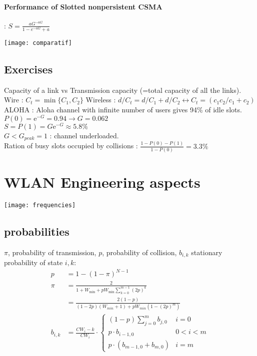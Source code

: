 \documentclass[6pt]{scrartcl}
\begin{document}
\begin{multicols}{4}
\paragraph{Performance of Slotted nonpersistent CSMA}:
$S = \frac{aG^{-aG}}{1-e^{-aG} + a}$

\texttt{[image: comparatif]}

\subsection{Exercises}
Capacity of a link vs Transmission capacity (=total capacity of all the links). Wire : $C_t=\min \{C_1, C_2\}$ Wireless : $d/C_t = d/C_1+d/C_2 \leftrightarrow C_t = (c_1 c_2/c_1+c_2)$\\
ALOHA : Aloha channel with infinite number of users gives 94\% of idle slots. $P(0) = \mathrm{e}^{-G}=0.94 \rightarrow G=0.062$ \\ $S=P(1)=G\mathrm{e}^{-G}\approx 5.8\%$ \\ $G<G_{peak} = 1$ : channel underloaded. \\ Ration of busy slots occupied by collisions : $\frac{1-P(0)-P(1)}{1-P(0)}=3.3\%$

\section{WLAN Engineering aspects}
\texttt{[image: frequencies]}










\subsection{probabilities}
$\pi$, probability of transmission, $p$, probability of collision,
$b_{i,k}$ stationary probability of state $i,k$:
\begin{align*}
p &= 1-(1-\pi)^{N-1} \\
\pi &= \frac{2}{ 1 + W_\textrm{min} + pW_\textrm{min}\sum^{m-1}_{k=0}(2p)^k}\\
	 &= \frac{2(1-p)}{(1-2p)(W_{min} + 1)+pW_{min}(1-(2p)^m)}\\
b_{i,k} &= \frac{CW_i - k}{CW_i} \cdot \left \{ \begin{array}{ll}
    (1-p) \sum_{j=0}^m b_{j,0} & i = 0\\
    p \cdot b_{i-1,0} & 0 < i < m\\
    p \cdot (b_{m-1,0} + b_{m,0}) & i = m
    \end{array} \right.
\end{align*}


\end{multicols}
\end{document}

